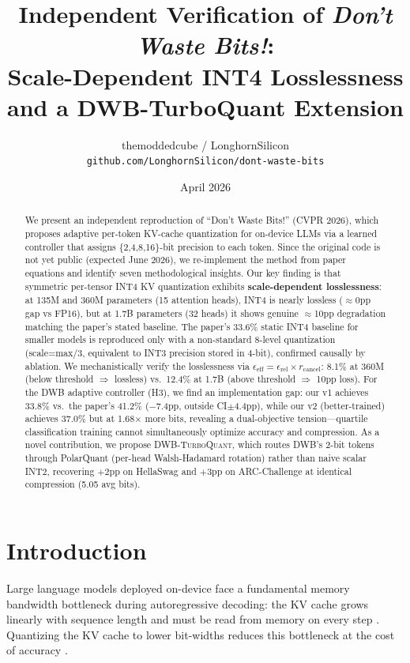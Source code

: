 \documentclass[10pt,twocolumn]{article}
\title{\textbf{Independent Verification of \textit{Don't Waste Bits!}:}\\
Scale-Dependent INT4 Losslessness and a DWB-TurboQuant Extension}
\author{
  themoddedcube / LonghornSilicon\\
  \texttt{github.com/LonghornSilicon/dont-waste-bits}
}
\date{April 2026}
\newcommand{\dwbtq}{\textsc{DWB-TurboQuant}}
\begin{document}
\maketitle

\begin{abstract}
We present an independent reproduction of ``Don't Waste Bits!''
\cite{haeri2026dwb} (CVPR 2026), which proposes adaptive per-token
KV-cache quantization for on-device LLMs via a learned controller that
assigns \{2,4,8,16\}-bit precision to each token.
Since the original code is not yet public (expected June 2026), we
re-implement the method from paper equations and identify seven
methodological insights.
Our key finding is that symmetric per-tensor INT4 KV quantization
exhibits \textbf{scale-dependent losslessness}: at 135M and 360M
parameters (15 attention heads), INT4 is nearly lossless
($\approx$0pp gap vs FP16), but at 1.7B parameters (32 heads) it shows
genuine $\approx$10pp degradation matching the paper's stated baseline.
The paper's 33.6\% static INT4 baseline for smaller models is reproduced
only with a non-standard 8-level quantization (scale=max/3, equivalent
to INT3 precision stored in 4-bit), confirmed causally by ablation.
We mechanistically verify the losslessness via
$\epsilon_\text{eff} = \epsilon_\text{rel} \times r_\text{cancel}$:
8.1\% at 360M (below threshold $\Rightarrow$ lossless) vs.\
12.4\% at 1.7B (above threshold $\Rightarrow$ 10pp loss).
For the DWB adaptive controller (H3), we find an implementation gap:
our v1 achieves 33.8\% vs.\ the paper's 41.2\% ($-$7.4pp, outside
CI$\pm$4.4pp), while our v2 (better-trained) achieves 37.0\% but at
1.68$\times$ more bits, revealing a dual-objective tension—quartile
classification training cannot simultaneously optimize accuracy and
compression.
As a novel contribution, we propose \dwbtq, which routes
DWB's 2-bit tokens through PolarQuant (per-head Walsh-Hadamard
rotation) rather than naive scalar INT2, recovering
$+$2pp on HellaSwag and $+$3pp on ARC-Challenge at identical
compression (5.05 avg bits).
\end{abstract}

\section{Introduction}
\label{sec:intro}

Large language models deployed on-device face a fundamental memory
bandwidth bottleneck during autoregressive decoding: the KV cache grows
linearly with sequence length and must be read from memory on every
step \cite{pope2023efficiently}.
Quantizing the KV cache to lower bit-widths reduces this bottleneck at
the cost of accuracy \cite{liu2024kivi,hooper2024kvquant}.
\end{document}

